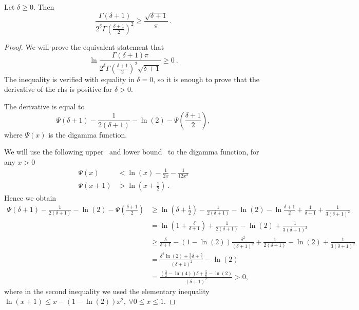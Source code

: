 \begin{lemma}
Let $\delta \geq 0$. Then
\[
\frac{\Gamma(\delta+1)}{2^\delta \Gamma(\frac{\delta+1}{2})^2} 
\geq \frac{\sqrt{\delta+1}}{\pi}~.
\]
\end{lemma}
\begin{proof}
We will prove the equivalent statement that
\[
\ln \frac{\Gamma(\delta+1) \pi}{2^\delta \Gamma(\frac{\delta+1}{2})^2 \sqrt{\delta+1}} \geq 0~.
\]
The inequality is verified with equality in $\delta=0$, so it is enough to prove that the derivative of the rhs is positive for $\delta>0$.

The derivative is equal to
\[
\Psi(\delta+1) - \frac{1}{2(\delta+1)} -\ln(2) -\Psi(\frac{\delta+1}{2}),
\]
where $\Psi(x)$ is the digamma function.

We will use the following upper~\citep{Chen05} and lower bound~\citep{Batir08} to the digamma function, for any $x>0$
\begin{align*}
\Psi(x) &< \ln(x) -\frac{1}{2x} -\frac{1}{12 x^2}\\
\Psi(x+1) &> \ln(x+\frac{1}{2})~.
\end{align*}
Hence we obtain
\begin{align*}
\Psi(\delta+1) - \frac{1}{2(\delta+1)} -\ln(2) -\Psi(\frac{\delta+1}{2})
&\geq \ln(\delta+\frac{1}{2})- \frac{1}{2(\delta+1)} -\ln(2) -\ln\frac{\delta+1}{2} +\frac{1}{\delta+1} +\frac{1}{3 (\delta+1)^2} \\
&= \ln(1+\frac{\delta}{\delta+1})+ \frac{1}{2(\delta+1)} -\ln(2)+\frac{1}{3 (\delta+1)^2} \\
&\geq \frac{\delta}{\delta+1} - (1-\ln(2))\frac{\delta^2}{(\delta+1)^2}+ \frac{1}{2(\delta+1)} -\ln(2)+\frac{1}{3 (\delta+1)^2}\\
&= \frac{\delta^2 \ln(2)+\frac{3}{2}\delta +\frac{5}{6}}{(\delta+1)^2} - \ln(2)\\
&= \frac{(\frac{3}{2}-\ln(4)) \delta +\frac{5}{6}-\ln(2)}{(\delta+1)^2} >0,
\end{align*}
where in the second inequality we used the elementary inequality $\ln(x+1) \leq x - (1-\ln(2))x^2, \ \forall 0\leq x \leq 1$.
\end{proof}
